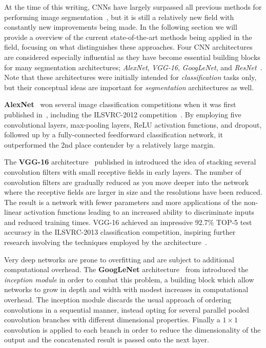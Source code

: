 At the time of this writing, CNNs have largely surpassed all previous methods for performing image segmentation~\cite{segmentation-overview}, but it is still a relatively new field with constantly new improvements being made.
In the following section we will provide a overview of the current state-of-the-art methods being applied in the field, focusing on what distinguishes these approaches.
Four CNN architectures are considered especially influential as they have become essential building blocks for many segmentation architectures; \textit{AlexNet}, \textit{VGG-16}, \textit{GoogLeNet}, and \textit{ResNet}~\cite{segmentation-overview}.
Note that these architectures were initially intended for \textit{classification} tasks only, but their conceptual ideas are important for \textit{segmentation} architectures as well.

\textbf{AlexNet}~\cite{segmentation-alexnet} won several image classification competitions when it was first published in~\citeyear{segmentation-alexnet}, including the ILSVRC-2012 competition~\cite{segmentation-overview}.
By employing five convolutional layers, max-pooling layers, ReLU activation functions, and dropout, followed up by a fully-connected feedforward classification network, it outperformed the 2nd place contender by a relatively large margin.

The \textbf{VGG-16} architecture~\cite{vgg-16} published in \citeyear{vgg-16} introduced the idea of stacking several convolution filters with small receptive fields in early layers.
The number of convolution filters are gradually reduced as you move deeper into the network where the receptive fields are larger in size and the resolutions have been reduced.
The result is a network with fewer parameters and more applications of the non-linear activation functions leading to an increased ability to discriminate inputs and reduced training times.
VGG-16 achieved an impressive 92.7\% TOP-5 test accuracy in the ILSVRC-2013 classification competition, inspiring further research involving the techniques employed by the architecture~\cite{segmentation-overview}.

Very deep networks are prone to overfitting and are subject to additional computational overhead.
The \textbf{GoogLeNet} architecture~\cite{googlenet} from \citeyear{googlenet} introduced the \textit{inception module} in order to combat this problem, a building block which allow networks to grow in depth and width with modest increases in computational overhead.
The inception module discards the usual approach of ordering convolutions in a sequential manner, instead opting for several parallel pooled convolution branches with different dimensional properties.
Finally a $1 \times 1$ convolution is applied to each branch in order to reduce the dimensionality of the output and the concatenated result is passed onto the next layer.

